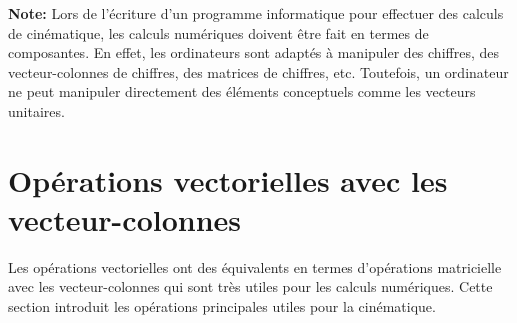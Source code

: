 \textbf{Note:} Lors de l'écriture d'un programme informatique pour effectuer des calculs de cinématique, les calculs numériques doivent être fait en termes de composantes. En effet, les ordinateurs sont adaptés à manipuler des chiffres, des vecteur-colonnes de chiffres, des matrices de chiffres, etc. Toutefois, un ordinateur ne peut manipuler directement des éléments conceptuels comme les vecteurs unitaires.  

\section{Opérations vectorielles avec les vecteur-colonnes} 
%
Les opérations vectorielles ont des équivalents en termes d'opérations matricielle avec les vecteur-colonnes qui sont très utiles pour les calculs numériques. Cette section introduit les opérations principales utiles pour la cinématique.


